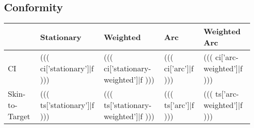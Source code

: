 \subsection{Conformity}
\begin{table}[H]
\begin{tabular}{l l l l l}
	& Stationary & Weighted & Arc & Weighted Arc \\
	\hline
	CI & ((( ci['stationary']|f ))) & ((( ci['stationary-weighted']|f ))) & ((( ci['arc']|f ))) & ((( ci['arc-weighted']|f ))) \\
	Skin-to-Target & ((( ts['stationary']|f ))) & ((( ts['stationary-weighted']|f ))) & ((( ts['arc']|f ))) & ((( ts['arc-weighted']|f )))
\end{tabular}
\end{table}
